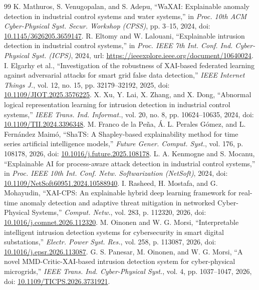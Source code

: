 \documentclass[10pt,a4paper]{article}
\begin{document}
\begin{thebibliography}{99}
 K. Mathuros, S. Venugopalan, and S. Adepu, ``WaXAI: Explainable anomaly detection in industrial control systems and water systems,'' in \emph{Proc. 10th ACM Cyber-Physical Syst. Secur. Workshop (CPSS)}, pp. 3--15, 2024, doi: \href{https://doi.org/10.1145/3626205.3659147}{10.1145/3626205.3659147}.
 R. Eltomy and W. Lalouani, ``Explainable intrusion detection in industrial control systems,'' in \emph{Proc. IEEE 7th Int. Conf. Ind. Cyber-Physical Syst. (ICPS)}, 2024, url: \url{https://ieeexplore.ieee.org/document/10640024}.
 I. Elgarhy et al., ``Investigation of the robustness of XAI-based federated learning against adversarial attacks for smart grid false data detection,'' \emph{IEEE Internet Things J.}, vol. 12, no. 15, pp. 32179--32192, 2025, doi: \href{https://doi.org/10.1109/JIOT.2025.3576225}{10.1109/JIOT.2025.3576225}.
 X. Xu, Y. Lai, X. Zhang, and X. Dong, ``Abnormal logical representation learning for intrusion detection in industrial control systems,'' \emph{IEEE Trans. Ind. Informat.}, vol. 20, no. 8, pp. 10624--10635, 2024, doi: \href{https://doi.org/10.1109/TII.2024.3396348}{10.1109/TII.2024.3396348}.
 M. Franco de la Pe\~na, \'A. L. Perales G\'omez, and L. Fern\'andez Maim\'o, ``ShaTS: A Shapley-based explainability method for time series artificial intelligence models,'' \emph{Future Gener. Comput. Syst.}, vol. 176, p. 108178, 2026, doi: \href{https://doi.org/10.1016/j.future.2025.108178}{10.1016/j.future.2025.108178}.
 L. A. Kenmogne and S. Mocanu, ``Explainable AI for process-aware attack detection in industrial control systems,'' in \emph{Proc. IEEE 10th Int. Conf. Netw. Softwarization (NetSoft)}, 2024, doi: \href{https://doi.org/10.1109/NetSoft60951.2024.10588940}{10.1109/NetSoft60951.2024.10588940}.
 I. Rasheed, H. Mostafa, and G. Mohayudin, ``XAI-CPS: An explainable hybrid deep learning framework for real-time anomaly detection and adaptive threat mitigation in networked Cyber-Physical Systems,'' \emph{Comput. Netw.}, vol. 283, p. 112320, 2026, doi: \href{https://doi.org/10.1016/j.comnet.2026.112320}{10.1016/j.comnet.2026.112320}.
 M. Oinonen and W. G. Morsi, ``Interpretable intelligent intrusion detection systems for cybersecurity in smart digital substations,'' \emph{Electr. Power Syst. Res.}, vol. 258, p. 113087, 2026, doi: \href{https://doi.org/10.1016/j.epsr.2026.113087}{10.1016/j.epsr.2026.113087}.
 G. S. Panesar, M. Oinonen, and W. G. Morsi, ``A novel MMD-Critic-XAI-based intrusion detection system for cyber-physical microgrids,'' \emph{IEEE Trans. Ind. Cyber-Physical Syst.}, vol. 4, pp. 1037--1047, 2026, doi: \href{https://doi.org/10.1109/TICPS.2026.3731921}{10.1109/TICPS.2026.3731921}.

\end{thebibliography}
\end{document}
